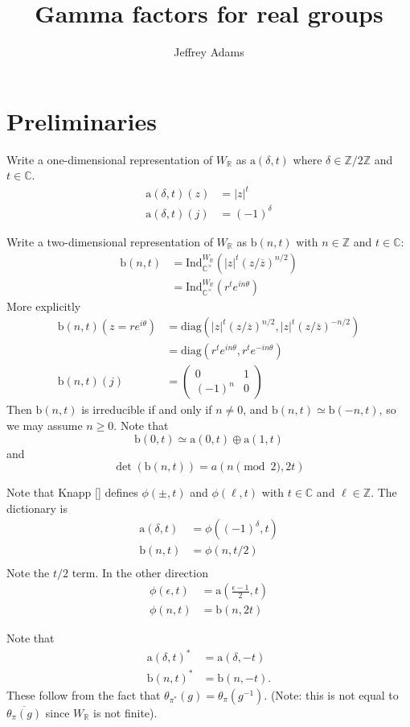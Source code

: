 \documentclass[10pt,leqno]{article}
\renewcommand{\sec}[1]{\section{#1}
\renewcommand{\theequation}{\thesection.\arabic{equation}}
  \setcounter{equation}{0}}
\newcommand{\diag}{\mathrm{diag}}
\newcommand{\Ind}{\mathrm{Ind}}
\newcommand{\R}{\mathbb R}
\newcommand{\C}{\mathbb C}
\newcommand{\Z}{\mathbb Z}
\renewcommand{\b}{\mathfrak b}
\renewcommand{\a}{\mathfrak a}
\newcommand\inv{^{-1}}
\renewcommand{\a}{\mathrm a}
\renewcommand{\b}{\mathrm b}
\begin{document}
\title{Gamma factors for real groups}
\author{Jeffrey Adams}
\maketitle




\sec{Preliminaries}

Write a one-dimensional representation of $W_\R$ as  $\a(\delta,t)$ where $\delta\in\Z/2\Z$ and $t\in\C$.
$$
\begin{aligned}
\a(\delta,t)(z)&=|z|^t\\
\a(\delta,t)(j)&=(-1)^\delta
\end{aligned}
$$

Write a two-dimensional representation of $W_\R$ as
$\b(n,t)$ with $n\in \Z$ and $t\in\C$:
$$
\begin{aligned}
\b(n,t)&=\Ind_{\C^\times}^{W_\R}(|z|^t(z/\overline z)^{n/2})\\
&=\Ind_{\C^\times}^{W_\R}(r^te^{in\theta})
\end{aligned}
$$
More explicitly
$$
\begin{aligned}
\b(n,t)(z=re^{i\theta})&=\diag(|z|^t(z/\overline z)^{n/2},|z|^{t}(z/\overline z)^{-n/2})\\
&=\diag(r^te^{in\theta},r^te^{-in\theta})\\
\b(n,t)(j)&=\begin{pmatrix}0&1\\(-1)^n&0\end{pmatrix}
\end{aligned}
$$
Then $\b(n,t)$ is irreducible if and only if $n\ne 0$, and $\b(n,t)\simeq\b(-n,t)$, so
we may assume $n\ge 0$.
Note that 
$$
\b(0,t)\simeq \a(0,t) \oplus \a(1,t)
$$
and
$$
\det(\b(n,t))=a(n\pmod 2,2t)
$$


Note that Knapp [] defines $\phi(\pm,t)$ and $\phi(\ell,t)$ with $t\in\C$ and $\ell\in\Z$. 
The dictionary is
$$
\begin{aligned}
\a(\delta,t)&=\phi((-1)^\delta,t)\\
\b(n,t)&=\phi(n,t/2)\\
\end{aligned}
$$
Note the $t/2$ term. In the other direction
$$
\begin{aligned}
\phi(\epsilon,t)&=\a(\frac{\epsilon-1}2,t)\\
\phi(n,t)&=\b(n,2t)
\end{aligned}
$$

Note that
$$
\begin{aligned}
\a(\delta,t)^*&=\a(\delta,-t)\\
\b(n,t)^*&=\b(n,-t).
\end{aligned}
$$
These follow from the fact that $\theta_{\pi^*}(g)=\theta_{\pi}(g\inv)$. (Note: this is not equal to $\overline{\theta_\pi(g)}$ since 
$W_\R$ is not finite). 
\end{document}
